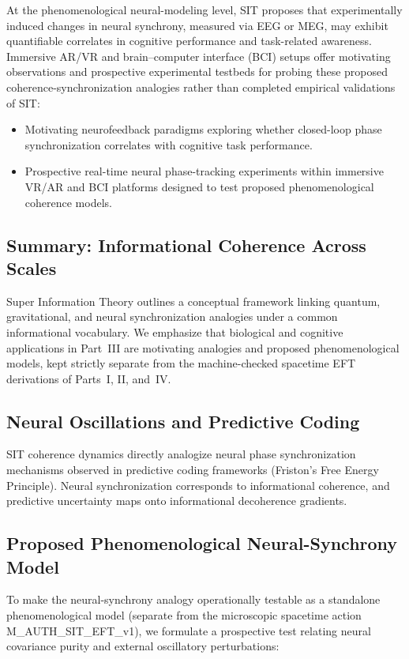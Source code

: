 \documentclass[american,11pt,letterpaper]{article}
\def\texttt#1{#1}%
\begin{document}
At the phenomenological neural-modeling level, SIT proposes that experimentally induced changes in neural synchrony, measured via EEG or MEG, may exhibit quantifiable correlates in cognitive performance and task-related awareness. Immersive AR/VR and brain--computer interface (BCI) setups offer motivating observations and prospective experimental testbeds for probing these proposed coherence-synchronization analogies rather than completed empirical validations of SIT:
\begin{itemize}
\item Motivating neurofeedback paradigms exploring whether closed-loop phase synchronization correlates with cognitive task performance.
\item Prospective real-time neural phase-tracking experiments within immersive VR/AR and BCI platforms designed to test proposed phenomenological coherence models.
\end{itemize}

\subsection{Summary: Informational Coherence Across Scales}

Super Information Theory outlines a conceptual framework linking quantum, gravitational, and neural synchronization analogies under a common informational vocabulary. We emphasize that biological and cognitive applications in Part~III are motivating analogies and proposed phenomenological models, kept strictly separate from the machine-checked spacetime EFT derivations of Parts~I, II, and~IV.

\subsection{Neural Oscillations and Predictive Coding}

SIT coherence dynamics directly analogize neural phase synchronization mechanisms observed in predictive coding frameworks (Friston's Free Energy Principle). Neural synchronization corresponds to informational coherence, and predictive uncertainty maps onto informational decoherence gradients.

\subsection{Proposed Phenomenological Neural-Synchrony Model}
\label{sec:SITneuroPrediction}

To make the neural-synchrony analogy operationally testable as a standalone phenomenological model (separate from the microscopic spacetime action \texttt{M\_AUTH\_SIT\_EFT\_v1}), we formulate a prospective test relating neural covariance purity and external oscillatory perturbations:
\end{document}
